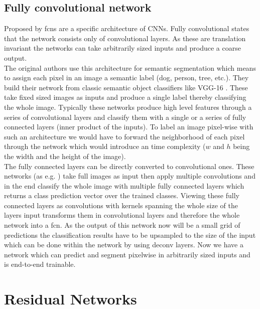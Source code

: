 \subsection{Fully convolutional network} %
\label{sub:conepts:fcn:fcn}
Proposed by \citet{long_fully_2015} \glspl{fcn} are a specific architecture of CNNs. Fully convolutional states that the network consists only of convolutional layers. As these are translation invariant the networks can take arbitrarily sized inputs and produce a coarse output.\\
The original authors use this architecture for semantic segmentation which means to assign each pixel in an image a semantic label (dog, person, tree, etc.). They build their network from classic semantic object classifiers like VGG-16 \citep{simonyan_very_2014}. These take fixed sized images as inputs and produce a single label thereby classifying the whole image. Typically these networks produce high level features through a series of convolutional layers and classify them with a single or a series of fully connected layers (inner product of the inputs). To label an image pixel-wise with such an architecture we would have to forward the neighborhood of each pixel through the network which would introduce an  time complexity ($w$ and $h$ being the width and the height of the image).\\
The fully connected layers can be directly converted to convolutional ones.
 These networks (as e.g. ) take full images as input then apply multiple convolutions and in the end classify the whole image with multiple fully connected layers which returns a class prediction vector over the trained classes. Viewing these fully connected layers as convolutions with kernels spanning the whole size of the layers input transforms them in convolutional layers and therefore the whole network into a \gls{fcn}. As the output of this network now will be a small grid of predictions the classification results have to be upsampled to the size of the input which can be done within the network by using deconv layers. Now we have a network which can predict and segment pixelwise in arbitrarily sized inputs and is end-to-end trainable.

\section{Residual Networks}
\label{sec:concepts:resnet}
